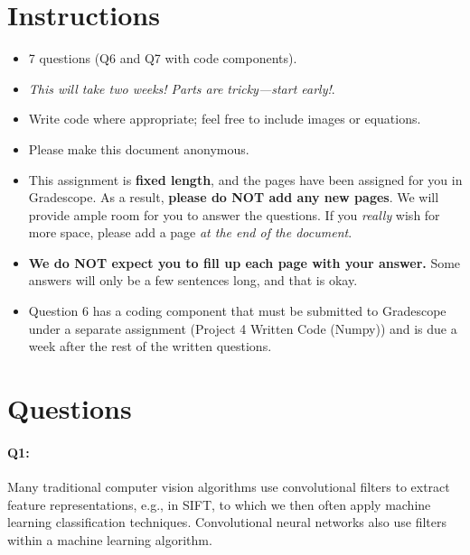 \maketitle
\vspace{-2cm}
\thispagestyle{fancy}

\section*{Instructions}
\begin{itemize}
  \item 7 questions (Q6 and Q7 with code components).
  \item \emph{This will take two weeks! Parts are tricky---start early!}.
  \item Write code where appropriate; feel free to include images or equations.
  \item Please make this document anonymous.
  \item This assignment is \textbf{fixed length}, and the pages have been assigned for you in Gradescope. As a result, \textbf{please do NOT add any new pages}. We will provide ample room for you to answer the questions. If you \emph{really} wish for more space, please add a page \emph{at the end of the document}.
  \item \textbf{We do NOT expect you to fill up each page with your answer.} Some answers will only be a few sentences long, and that is okay.
  \item Question 6 has a coding component that must be submitted to Gradescope under a separate assignment (Project 4 Written Code (Numpy)) and is due a week after the rest of the written questions.
\end{itemize}

\section*{Questions}


\paragraph{Q1:} Many traditional computer vision algorithms use convolutional filters to extract feature representations, e.g., in SIFT, to which we then often apply machine learning classification techniques. Convolutional neural networks also use filters within a machine learning algorithm.

